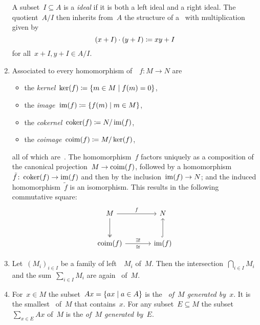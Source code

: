 \begin{remarkdefinition}
\begin{enumerate}
      A subset~$I \subseteq A$ is a \emph{{\twosided} ideal} if it is both a left ideal and a right ideal.
      The quotient~$A/I$ then inherits from~$A$ the structure of a~{\kalg} with multiplication given by
      \[
                  (x + I) \cdot (y + I)
        \coloneqq  xy + I
      \]
      for all~$x + I, y + I \in A/I$.
    \item
      Associated to every homomorphism of~{}~$f \colon M \to N$ are
      \begin{itemize}
        \item
          the \emph{kernel}~$\ker(f) \defined \{m \in M \suchthat f(m) = 0\}$,
        \item
          the \emph{image}~$\im(f) \defined \{f(m) \suchthat m \in M\}$,
        \item
          the \emph{cokernel}~$\operatorname{coker}(f) \coloneqq N/\operatorname{im}(f)$,
        \item
          the \emph{coimage}~$\operatorname{coim}(f) \coloneqq M/\ker(f)$,
      \end{itemize}
      all of which are~{}.
      The homomorphism~$f$ factors uniquely as a composition of the canonical projection~$M \to \operatorname{coim}(f)$, followed by a homomorphism~$\tilde{f} \colon \operatorname{coker}(f) \to \operatorname{im}(f)$ and then by the inclusion~$\operatorname{im}(f) \to N$; and the induced homomorphism~$\tilde{f}$ is an isomorphism.
      This results in the following commutative square:
      \[
        \begin{tikzcd}[sep = large]
            M
            \arrow{r}[above]{f}
            \arrow[two heads]{d}
          & N
          \\
            \coim(f)
            \arrow{r}[above]{\exists!}[below]{\cong}
          & \im(f)
            \arrow[hook]{u}
        \end{tikzcd}
      \]
    \item
      Let~$(M_i)_{i \in I}$ be a family of left~{}~$M_i$ of~$M$.
      Then the intersection~$\bigcap_{i \in I} M_i$ and the sum~$\sum_{i \in I} M_i$ are again~{} of~$M$.
    \item
      For~$x \in M$ the subset~$Ax = \{ax \suchthat a \in A\}$ is the~\emph{{} of~$M$ generated by~$x$}.
      It is the smallest~{} of~$M$ that contains~$x$.
      For any subset~$E \subseteq M$ the subset~$\sum_{x \in E} Ax$ of~$M$ is the \emph{{} of~$M$ generated by~$E$}.

\end{enumerate}
\end{remarkdefinition}
